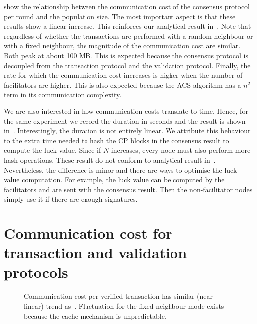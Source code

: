  show the relationship between the communication cost of the consensus protocol per round and the population size.
The most important aspect is that these results show a linear increase.
This reinforces our analytical result in~.
Note that regardless of whether the transactions are performed with a random neighbour or with a fixed neighbour,
the magnitude of the communication cost are similar.
Both peak at about 100 MB.
This is expected because the consensus protocol is decoupled from the transaction protocol and the validation protocol.
Finally, the rate for which the communication cost increases is higher when the number of facilitators are higher.
This is also expected because the ACS algorithm has a $n^2$ term in its communication complexity.

We are also interested in how communication costs translate to time.
Hence, for the same experiment we record the duration in seconds and the result is shown in~.
Interestingly, the duration is not entirely linear.
We attribute this behaviour to the extra time needed to hash the CP blocks in the consensus result to compute the luck value.
Since if $N$ increases, every node must also perform more hash operations.
These result do not conform to analytical result in~.
Nevertheless, the difference is minor and there are ways to optimise the luck value computation.
For example, the luck value can be computed by the facilitators and are sent with the consensus result.
Then the non-facilitator nodes simply use it if there are enough signatures.

\section{Communication cost for transaction and validation protocols}

\begin{figure}[h]
  \centering
  \caption{Communication cost per verified transaction has similar (near linear) trend as~.
  Fluctuation for the fixed-neighbour mode exists because the cache mechanism is unpredictable.}
  \label{fig:tx-comms}
\end{figure}

